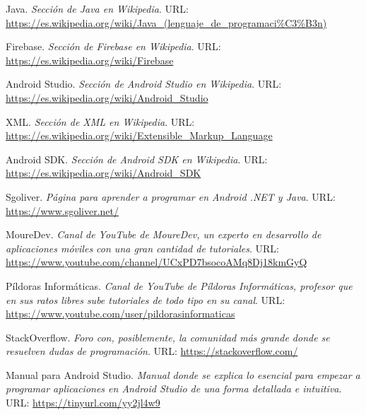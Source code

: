 \begin{thebibliography}{9}
    
  Java. \textit{Sección de Java en Wikipedia}. URL: \url{https://es.wikipedia.org/wiki/Java_(lenguaje_de_programaci%C3%B3n)}

  Firebase. \textit{Sección de Firebase en Wikipedia}. URL: \url{https://es.wikipedia.org/wiki/Firebase}

  Android Studio. \textit{Sección de Android Studio en Wikipedia}. URL: \url{https://es.wikipedia.org/wiki/Android_Studio}

  XML. \textit{Sección de XML en Wikipedia}. URL: \url{https://es.wikipedia.org/wiki/Extensible_Markup_Language}

  Android SDK. \textit{Sección de Android SDK en Wikipedia}. URL: \url{https://es.wikipedia.org/wiki/Android_SDK}

  Sgoliver. \textit{Página para aprender a programar en Android .NET y Java}. URL: \url{https://www.sgoliver.net/}

  MoureDev. \textit{Canal de YouTube de MoureDev, un experto en desarrollo de aplicaciones móviles con una gran cantidad de tutoriales}. URL: \url{https://www.youtube.com/channel/UCxPD7bsocoAMq8Dj18kmGyQ}

  Píldoras Informáticas. \textit{Canal de YouTube de Píldoras Informáticas, profesor que en sus ratos libres sube tutoriales de todo tipo en su canal}. URL: \url{https://www.youtube.com/user/pildorasinformaticas}

  StackOverflow. \textit{Foro con, posiblemente, la comunidad más grande donde se resuelven dudas de programación}. URL: \url{https://stackoverflow.com/}

  Manual para Android Studio. \textit{Manual donde se explica lo esencial para empezar a programar aplicaciones en Android Studio de una forma detallada e intuitiva}. URL: \url{https://tinyurl.com/yy2jl4w9} 

\end{thebibliography}